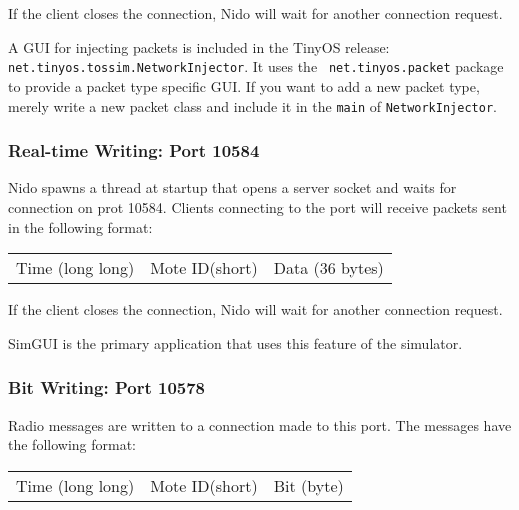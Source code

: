 \documentclass[10pt]{article}
\begin{document}
If the client closes the connection, Nido will wait for another
connection request.

A GUI for injecting packets is included in the TinyOS release: {\tt
net.tinyos.tossim.NetworkInjector}. It uses the {\tt
net.tinyos.packet} package to provide a packet type specific GUI. If
you want to add a new packet type, merely write a new packet class and
include it in the {\tt main} of {\tt NetworkInjector}. 

\subsubsection*{Real-time Writing: Port 10584}
Nido spawns a thread at startup that opens a server socket and waits
for connection on prot 10584. Clients connecting to the port will
receive packets sent in the following format:

\vspace{0.1in}
\begin{tabular}{|c|c|c|}\hline
\hspace{2in} & \hspace{2in} & \hspace{0.5in} \\ \hline
Time (long long)& Mote ID(short) & Data (36 bytes) \\ \hline
\end{tabular}
\vspace{0.1in}

If the client closes the connection, Nido will wait for another
connection request.

SimGUI is the primary application that uses this feature of the simulator.

\subsubsection*{Bit Writing: Port 10578}

Radio messages are written to a connection made to this port. The
messages have the following format:

\vspace{0.1in}
\begin{tabular}{|c|c|c|}\hline
\hspace{4in} & \hspace{1in} & \hspace{0.5in} \\ \hline
Time (long long)& Mote ID(short) & Bit (byte) \\ \hline
\end{tabular}
\vspace{0.1in}
\end{document}
